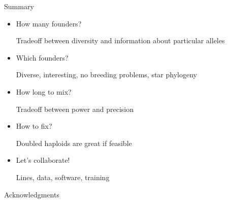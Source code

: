\documentclass[12pt]{article}
\newcommand{\headsize}{\fontsize{35}{35} \selectfont}
\newcommand{\smallsize}{\fontsize{25}{30} \selectfont}
\newcommand{\smallersize}{\fontsize{20}{25} \selectfont}
\begin{document}
{\begin{minipage}{10in}
\begin{itemize}
\end{itemize}
\end{minipage}


\newpage

\addtocounter{page}{-1}

\headsize \color{myyellow}
\hfill \begin{minipage}{5.75in}
\centering
Summary
\end{minipage}

\vspace{15mm}

\color{mywhite}
\smallsize

\hfill \begin{minipage}{10in}
\begin{itemize}
\itemsep24pt
\item How many founders?

{\smallersize \color{myblue} Tradeoff between {\color{mypink} diversity} and information about
  {\color{mypink} particular alleles}}

\item Which founders?

{\smallersize \color{myblue} Diverse, interesting, no breeding
  problems, star phylogeny}

\item How long to mix?

{\smallersize \color{myblue} Tradeoff between {\color{mypink} power}
  and {\color{mypink} precision}}

\item How to fix?

{\smallersize \color{myblue} Doubled haploids are great if feasible}

\item Let's {\color{mypink} collaborate}!

{\smallersize \color{myblue} Lines, data, software, training}


\end{itemize}
\end{minipage}



\newpage


\headsize \color{myyellow}
\hfill \begin{minipage}{5.75in}
\centering
Acknowledgments
\end{minipage}

\vspace{20mm} \color{mywhite} \smallersize

}
\end{document}
